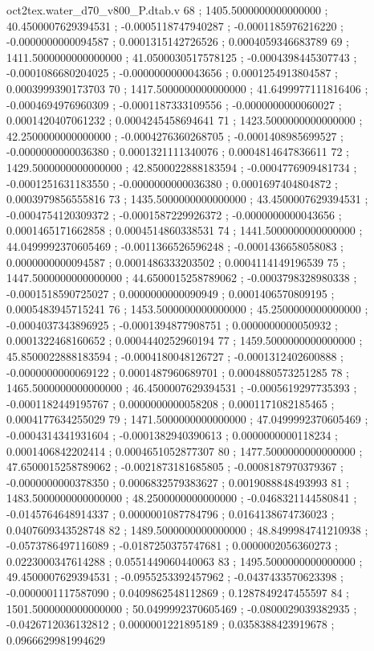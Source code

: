 \begin{filecontents}[overwrite]{oct2tex.water_d70_v800_P.dtab.v}
68 ; 1405.5000000000000000 ; 40.4500007629394531 ; -0.0005118747940287 ; -0.0001185976216220 ; -0.0000000000094587 ; 0.0001315142726526 ; 0.0004059346683789
69 ; 1411.5000000000000000 ; 41.0500030517578125 ; -0.0004398445307743 ; -0.0001086680204025 ; -0.0000000000043656 ; 0.0001254913804587 ; 0.0003999390173703
70 ; 1417.5000000000000000 ; 41.6499977111816406 ; -0.0004694976960309 ; -0.0001187333109556 ; -0.0000000000060027 ; 0.0001420407061232 ; 0.0004245458694641
71 ; 1423.5000000000000000 ; 42.2500000000000000 ; -0.0004276360268705 ; -0.0001408985699527 ; -0.0000000000036380 ; 0.0001321111340076 ; 0.0004814647836611
72 ; 1429.5000000000000000 ; 42.8500022888183594 ; -0.0004776909481734 ; -0.0001251631183550 ; -0.0000000000036380 ; 0.0001697404804872 ; 0.0003979856555816
73 ; 1435.5000000000000000 ; 43.4500007629394531 ; -0.0004754120309372 ; -0.0001587229926372 ; -0.0000000000043656 ; 0.0001465171662858 ; 0.0004514860338531
74 ; 1441.5000000000000000 ; 44.0499992370605469 ; -0.0011366526596248 ; -0.0001436658058083 ; 0.0000000000094587 ; 0.0001486333203502 ; 0.0004114149196539
75 ; 1447.5000000000000000 ; 44.6500015258789062 ; -0.0003798328980338 ; -0.0001518590725027 ; 0.0000000000090949 ; 0.0001406570809195 ; 0.0005483945715241
76 ; 1453.5000000000000000 ; 45.2500000000000000 ; -0.0004037343896925 ; -0.0001394877908751 ; 0.0000000000050932 ; 0.0001322468160652 ; 0.0004440252960194
77 ; 1459.5000000000000000 ; 45.8500022888183594 ; -0.0004180048126727 ; -0.0001312402600888 ; -0.0000000000069122 ; 0.0001487960689701 ; 0.0004880573251285
78 ; 1465.5000000000000000 ; 46.4500007629394531 ; -0.0005619297735393 ; -0.0001182449195767 ; 0.0000000000058208 ; 0.0001171082185465 ; 0.0004177634255029
79 ; 1471.5000000000000000 ; 47.0499992370605469 ; -0.0004314341931604 ; -0.0001382940390613 ; 0.0000000000118234 ; 0.0001406842202414 ; 0.0004651052877307
80 ; 1477.5000000000000000 ; 47.6500015258789062 ; -0.0021873181685805 ; -0.0008187970379367 ; -0.0000000000378350 ; 0.0006832579383627 ; 0.0019088848493993
81 ; 1483.5000000000000000 ; 48.2500000000000000 ; -0.0468321144580841 ; -0.0145764648914337 ; 0.0000001087784796 ; 0.0164138674736023 ; 0.0407609343528748
82 ; 1489.5000000000000000 ; 48.8499984741210938 ; -0.0573786497116089 ; -0.0187250375747681 ; 0.0000002056360273 ; 0.0223000347614288 ; 0.0551449060440063
83 ; 1495.5000000000000000 ; 49.4500007629394531 ; -0.0955253392457962 ; -0.0437433570623398 ; -0.0000001117587090 ; 0.0409862548112869 ; 0.1287849247455597
84 ; 1501.5000000000000000 ; 50.0499992370605469 ; -0.0800029039382935 ; -0.0426712036132812 ; 0.0000001221895189 ; 0.0358388423919678 ; 0.0966629981994629

\end{filecontents}
